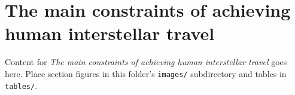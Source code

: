 \section{The main constraints of achieving human interstellar travel}
\label{sec:the_main_constraints_of_achieving_human_interstellar_travel}

Content for \emph{The main constraints of achieving human interstellar travel} goes here. Place section figures in this
folder's \texttt{images/} subdirectory and tables in \texttt{tables/}.
